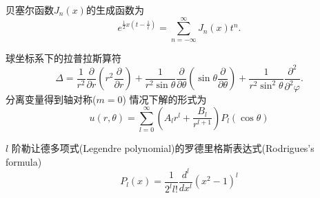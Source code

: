\documentclass{njustexam}
\begin{document}
贝塞尔函数$J_n(x)$的生成函数为
$$e^{\frac{1}{2} x (t - \frac{1}{t})}   = \sum_{n=-\infty} ^{\infty} J_n(x)t^{n}.
$$


球坐标系下的拉普拉斯算符
\[
 \Delta = \frac{1}{r^2} \frac{\partial}{\partial r} \left( r^2 \frac{\partial }{\partial r} \right)
  + \frac{1}{r^2\sin \theta} \frac{\partial}{\partial \theta} \left( \sin\theta \frac{\partial}{\partial \theta} \right)
  + \frac{1}{r^2\sin^2 \theta} \frac{\partial^2}{\partial^2 \varphi} .
\]
分离变量得到轴对称($m=0$)
情况下解的形式为
\[
  u(r,  \theta) = \sum_{l=0}^{\infty} \left( A_l r^l + \frac{B_l}{r^{l+1}} \right) P_{l} (\cos \theta)
\]

\bigskip

$l$ 阶勒让德多项式(Legendre polynomial)的罗德里格斯表达式(Rodrigues's formula) 
$$P_l(x)=\frac{1}{2^l l !} \frac{d^l}{d x^l}\left(x^2-1\right)^l$$
\end{document}
